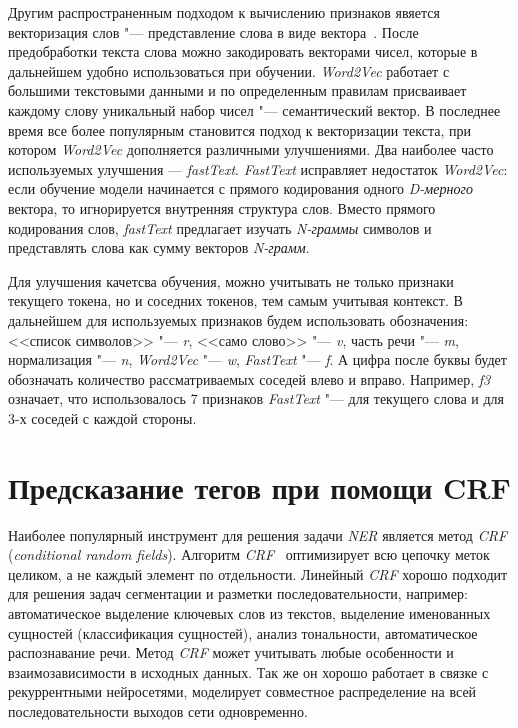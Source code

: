 \documentclass{csmathnotes}
\begin{document}
 
Другим распространенным подходом к вычислению признаков явяется векторизация слов "---  представление слова в виде вектора~\cite{w2v}.
После предобработки текста слова можно закодировать векторами чисел, которые в дальнейшем удобно использоваться при обучении.
\emph{Word2Vec} работает с большими текстовыми данными и по определенным правилам присваивает каждому слову уникальный набор чисел "--- семантический вектор. В последнее время все более популярным становится подход к векторизации текста, при котором \emph{Word2Vec} дополняется различными улучшениями. Два наиболее часто используемых улучшения — \emph{fastText}. \emph{FastText} исправляет недостаток \emph{Word2Vec}: если обучение модели начинается с прямого кодирования одного \emph{D-мерного} вектора, то игнорируется внутренняя структура слов. Вместо прямого кодирования слов, \emph{fastText} предлагает изучать \emph{N-граммы} символов и представлять слова как сумму векторов \emph{N-грамм}.


Для улучшения качетсва обучения, можно учитывать не только признаки текущего токена, но и соседних токенов, тем самым учитывая контекст.
В дальнейшем для используемых признаков будем использовать обозначения: <<список символов>> "--- \emph{r}, <<само слово>> "--- \emph{v}, часть речи "--- \emph{m}, нормализация "--- \emph{n}, \emph{Word2Vec} "--- \emph{w}, \emph{FastText} "--- \emph{f}.
А цифра после буквы будет обозначать количество рассматриваемых соседей влево и вправо.
Например, \emph{f3} означает, что использовалось 7 признаков \emph{FastText} "--- для текущего слова и для 3-х соседей с каждой стороны.

\section*{Предсказание тегов при помощи CRF}
Наиболее  популярный инструмент для решения задачи \emph{NER} является метод \emph{CRF} (\emph{conditional random fields}). 
Алгоритм \emph{CRF}~\cite{HabrCRF} оптимизирует всю цепочку меток целиком, а не каждый элемент по отдельности.
Линейный \emph{CRF} хорошо подходит для решения задач сегментации и разметки последовательности,
например: автоматическое выделение ключевых слов из текстов, выделение именованных сущностей (классификация сущностей), анализ тональности, автоматическое распознавание речи.
Метод \emph{CRF} может учитывать любые особенности и взаимозависимости в исходных данных. Так же он хорошо работает в связке с рекуррентными нейросетями, моделирует совместное распределение на всей последовательности выходов сети одновременно.
\end{document}
